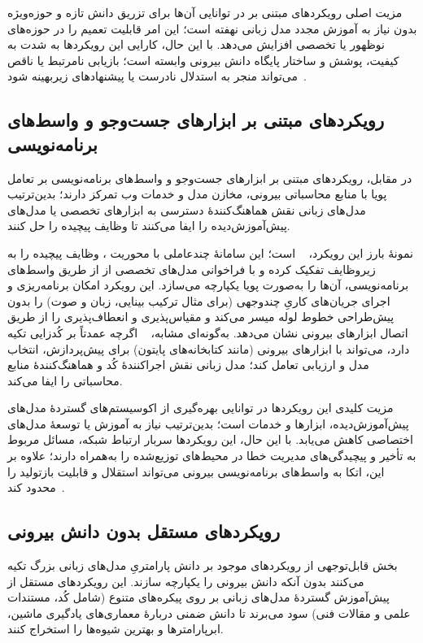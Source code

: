 مزیت اصلی رویکردهای مبتنی بر  در توانایی آن‌ها برای تزریق دانش تازه و حوزه‌ویژه بدون نیاز به آموزش مجدد مدل زبانی نهفته است؛ این امر قابلیت تعمیم را در حوزه‌های نوظهور یا تخصصی افزایش می‌دهد. با این حال، کارایی این رویکردها به شدت به کیفیت، پوشش و ساختار پایگاه دانش بیرونی وابسته است؛ بازیابی نامرتبط یا ناقص می‌تواند منجر به استدلال نادرست یا پیشنهادهای زیربهینه شود~\cite{Yang2025NADER,zhang-etal-2024-MLCopilot}.

\subsection{رویکردهای مبتنی بر ابزارهای جست‌وجو و واسط‌های برنامه‌نویسی}
در مقابل، رویکردهای مبتنی بر ابزارهای جست‌وجو و واسط‌های برنامه‌نویسی بر تعامل پویا با منابع محاسباتی بیرونی، مخازن مدل و خدمات وب تمرکز دارند؛ بدین‌ترتیب مدل‌های زبانی نقش هماهنگ‌کنندهٔ دسترسی به ابزارهای تخصصی یا مدل‌های پیش‌آموزش‌دیده را ایفا می‌کنند تا وظایف پیچیده را حل کنند.

نمونهٔ بارز این رویکرد، ~\cite{shen2023HuggingGPT} است؛ این سامانهٔ چندعاملی با محوریت ، وظایف پیچیده را به زیروظایف تفکیک کرده و با فراخوانی مدل‌های تخصصی از  از طریق واسط‌های برنامه‌نویسی، آن‌ها را به‌صورت پویا یکپارچه می‌سازد. این رویکرد امکان برنامه‌ریزی و اجرای جریان‌های کاریِ چندوجهی (برای مثال ترکیب بینایی، زبان و صوت) را بدون پیش‌طراحی خطوط لوله میسر می‌کند و مقیاس‌پذیری و انعطاف‌پذیری را از طریق اتصال ابزارهای بیرونی نشان می‌دهد. به‌گونه‌ای مشابه، ~\cite{zhang2023AutomlGPTAutomaticMachineLearning} اگرچه عمدتاً بر کُدزایی تکیه دارد، می‌تواند با ابزارهای بیرونی (مانند کتابخانه‌های پایتون) برای پیش‌پردازش، انتخاب مدل و ارزیابی تعامل کند؛ مدل زبانی نقش اجراکنندهٔ کُد و هماهنگ‌کنندهٔ منابع محاسباتی را ایفا می‌کند.

مزیت کلیدی این رویکردها در توانایی بهره‌گیری از اکوسیستم‌های گستردهٔ مدل‌های پیش‌آموزش‌دیده، ابزارها و خدمات است؛ بدین‌ترتیب نیاز به آموزش یا توسعهٔ مدل‌های اختصاصی کاهش می‌یابد. با این حال، این رویکردها سربار ارتباط شبکه، مسائل مربوط به تأخیر و پیچیدگی‌های مدیریت خطا در محیط‌های توزیع‌شده را به‌همراه دارند؛ علاوه بر این، اتکا به واسط‌های برنامه‌نویسی بیرونی می‌تواند استقلال و قابلیت بازتولید را محدود کند~\cite{shen2023HuggingGPT}.

\subsection{رویکردهای مستقل بدون دانش بیرونی}
بخش قابل‌توجهی از رویکردهای موجود بر دانش پارامتریِ مدل‌های زبانی بزرگ تکیه می‌کنند بدون آنکه دانش بیرونی را یکپارچه سازند. این رویکردهای مستقل از پیش‌آموزش گستردهٔ مدل‌های زبانی بر روی پیکره‌های متنوع (شامل کُد، مستندات علمی و مقالات فنی) سود می‌برند تا دانش ضمنی دربارهٔ معماری‌های یادگیری ماشین، ابرپارامترها و بهترین شیوه‌ها را استخراج کنند.

